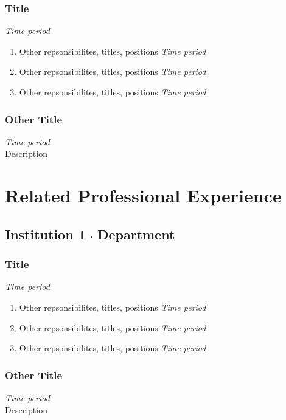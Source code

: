 \documentclass[11pt,letterpaper]{article}
\newcommand*\sq{\mathbin{\vcenter{\hbox{\rule{.3ex}{.3ex}}}}} %
\begin{document}
\subsubsection*{Title}\hfill{\textit{Time period}}
\begin{enumerate}[leftmargin=*,topsep=0pt,itemsep=-1ex,partopsep=1ex,parsep=1ex,label=(\arabic*)]
    \item[]\indent\indent Other repsonsibilites, titles, positions \hfill{\textit{Time period}}
    \item[]\indent\indent Other repsonsibilites, titles, positions \hfill{\textit{Time period}}
    \item[]\indent\indent Other repsonsibilites, titles, positions \hfill{\textit{Time period}}
\end{enumerate}
\subsubsection*{Other Title}\hfill{\textit{Time period}}\\
Description


\section*{Related Professional Experience}
\subsection*{Institution 1 $\sq$ Department}
\subsubsection*{Title}\hfill{\textit{Time period}}
\begin{enumerate}[leftmargin=*,topsep=0pt,itemsep=-1ex,partopsep=1ex,parsep=1ex,label=(\arabic*)]
    \item[]\indent\indent Other repsonsibilites, titles, positions \hfill{\textit{Time period}}
    \item[]\indent\indent Other repsonsibilites, titles, positions \hfill{\textit{Time period}}
    \item[]\indent\indent Other repsonsibilites, titles, positions \hfill{\textit{Time period}}
\end{enumerate}
\subsubsection*{Other Title}\hfill{\textit{Time period}}\\
Description
\end{document}
